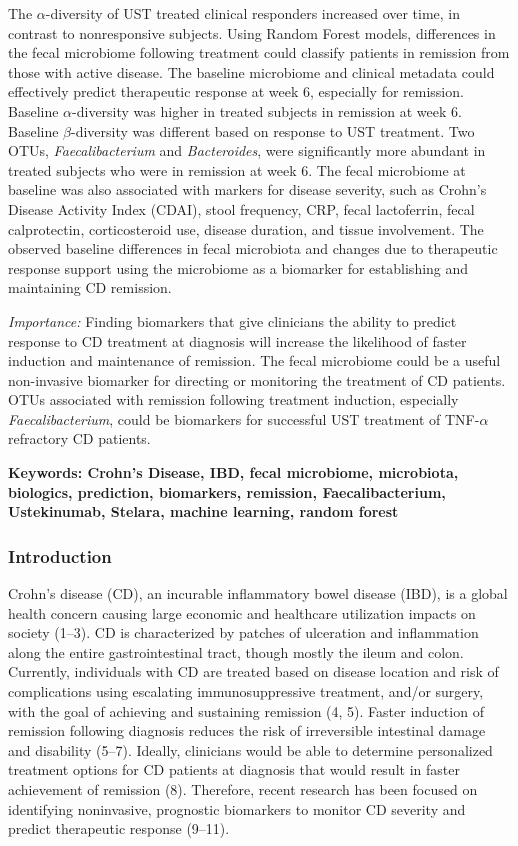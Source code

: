 \documentclass[11pt,]{article}
\begin{document}
The \({\alpha}\)-diversity of UST treated clinical responders increased
over time, in contrast to nonresponsive subjects. Using Random Forest
models, differences in the fecal microbiome following treatment could
classify patients in remission from those with active disease. The
baseline microbiome and clinical metadata could effectively predict
therapeutic response at week 6, especially for remission. Baseline
\({\alpha}\)-diversity was higher in treated subjects in remission at
week 6. Baseline \({\beta}\)-diversity was different based on response
to UST treatment. Two OTUs, \emph{Faecalibacterium} and
\emph{Bacteroides}, were significantly more abundant in treated subjects
who were in remission at week 6. The fecal microbiome at baseline was
also associated with markers for disease severity, such as Crohn's
Disease Activity Index (CDAI), stool frequency, CRP, fecal lactoferrin,
fecal calprotectin, corticosteroid use, disease duration, and tissue
involvement. The observed baseline differences in fecal microbiota and
changes due to therapeutic response support using the microbiome as a
biomarker for establishing and maintaining CD remission.

\emph{Importance:} Finding biomarkers that give clinicians the ability
to predict response to CD treatment at diagnosis will increase the
likelihood of faster induction and maintenance of remission. The fecal
microbiome could be a useful non-invasive biomarker for directing or
monitoring the treatment of CD patients. OTUs associated with remission
following treatment induction, especially \emph{Faecalibacterium}, could
be biomarkers for successful UST treatment of TNF-\({\alpha}\)
refractory CD patients.

\textbf{Keywords: Crohn's Disease, IBD, fecal microbiome, microbiota,
biologics, prediction, biomarkers, remission, Faecalibacterium,
Ustekinumab, Stelara, machine learning, random forest}

\newpage

\subsubsection{Introduction}\label{introduction}

Crohn's disease (CD), an incurable inflammatory bowel disease (IBD), is
a global health concern causing large economic and healthcare
utilization impacts on society (1--3). CD is characterized by patches of
ulceration and inflammation along the entire gastrointestinal tract,
though mostly the ileum and colon. Currently, individuals with CD are
treated based on disease location and risk of complications using
escalating immunosuppressive treatment, and/or surgery, with the goal of
achieving and sustaining remission (4, 5). Faster induction of remission
following diagnosis reduces the risk of irreversible intestinal damage
and disability (5--7). Ideally, clinicians would be able to determine
personalized treatment options for CD patients at diagnosis that would
result in faster achievement of remission (8). Therefore, recent
research has been focused on identifying noninvasive, prognostic
biomarkers to monitor CD severity and predict therapeutic response
(9--11).
\end{document}
